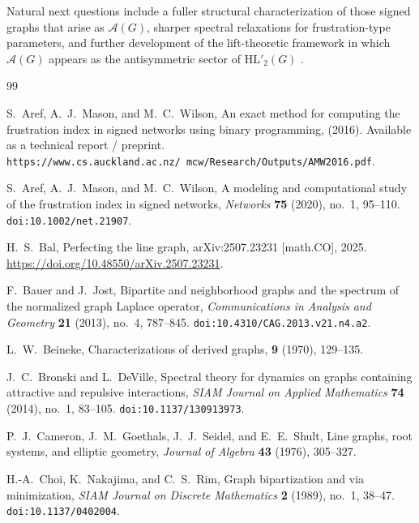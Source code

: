 \documentclass[11pt]{article}
\theoremstyle{plain}
\begin{document}
Natural next questions include a fuller structural characterization of those
signed graphs that arise as $\mathcal A(G)$, sharper spectral relaxations for
frustration-type parameters, and further development of the lift-theoretic
framework in which $\mathcal A(G)$ appears as the antisymmetric sector of
$\mathrm{HL}'_2(G)$ \cite{BalHL}.

\begin{thebibliography}{99}

S.~Aref, A.~J.~Mason, and M.~C.~Wilson,
\newblock An exact method for computing the frustration index in signed networks using binary programming,
\newblock (2016). Available as a technical report / preprint.
\newblock \texttt{https://www.cs.auckland.ac.nz/\string~mcw/Research/Outputs/AMW2016.pdf}. 

S.~Aref, A.~J.~Mason, and M.~C.~Wilson,
\newblock A modeling and computational study of the frustration index in signed networks,
\newblock \emph{Networks} \textbf{75} (2020), no.~1, 95--110.
\newblock \texttt{doi:10.1002/net.21907}.

H.~S.~Bal,
\newblock Perfecting the line graph,
 arXiv:2507.23231 [math.CO], 2025.
\newblock \url{https://doi.org/10.48550/arXiv.2507.23231}.

F.~Bauer and J.~Jost,
\newblock Bipartite and neighborhood graphs and the spectrum of the normalized graph Laplace operator,
\newblock \emph{Communications in Analysis and Geometry} \textbf{21} (2013), no.~4, 787--845.
\newblock \texttt{doi:10.4310/CAG.2013.v21.n4.a2}.

L.~W.~Beineke,
\newblock Characterizations of derived graphs,
 {\bf 9} (1970), 129--135.

J.~C.~Bronski and L.~DeVille,
\newblock Spectral theory for dynamics on graphs containing attractive and repulsive interactions,
\newblock \emph{SIAM Journal on Applied Mathematics} \textbf{74} (2014), no.~1, 83--105.
\newblock \texttt{doi:10.1137/130913973}.

P.~J.~Cameron, J.~M.~Goethals, J.~J.~Seidel, and E.~E.~Shult,
\newblock Line graphs, root systems, and elliptic geometry,
\newblock \emph{Journal of Algebra} \textbf{43} (1976), 305--327.

H.-A.~Choi, K.~Nakajima, and C.~S.~Rim,
\newblock Graph bipartization and via minimization,
\newblock \emph{SIAM Journal on Discrete Mathematics} \textbf{2} (1989), no.~1, 38--47.
\newblock \texttt{doi:10.1137/0402004}. 


\end{thebibliography}
\end{document}
